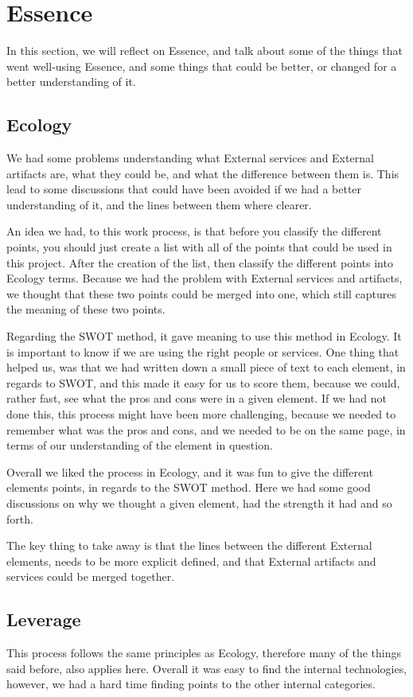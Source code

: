 \section{Essence}\label{sec:eval_essence}
In this section, we will reflect on Essence, and talk about some of the things that went well-using Essence, and some things that could be better, or changed for a better understanding of it.

\subsection{Ecology}
We had some problems understanding what External services and External artifacts are, what they could be, and what the difference between them is.
This lead to some discussions that could have been avoided if we had a better understanding of it, and the lines between them where clearer.

An idea we had, to this work process, is that before you classify the different points, you should just create a list with all of the points that could be used in this project.
After the creation of the list, then classify the different points into Ecology terms.
Because we had the problem with External services and artifacts, we thought that these two points could be merged into one, which still captures the meaning of these two points.

Regarding the SWOT method, it gave meaning to use this method in Ecology. 
It is important to know if we are using the right people or services.
One thing that helped us, was that we had written down a small piece of text to each element, in regards to SWOT, and this made it easy for us to score them, because we could, rather fast, see what the pros and cons were in a given element.
If we had not done this, this process might have been more challenging, because we needed to remember what was the pros and cons, and we needed to be on the same page, in terms of our understanding of the element in question.

Overall we liked the process in Ecology, and it was fun to give the different elements points, in regards to the SWOT method. 
Here we had some good discussions on why we thought a given element, had the strength it had and so forth.

The key thing to take away is that the lines between the different External elements, needs to be more explicit defined, and that External artifacts and services could be merged together.

\subsection{Leverage}
This process follows the same principles as Ecology, therefore many of the things said before, also applies here.
Overall it was easy to find the internal technologies, however, we had a hard time finding points to the other internal categories.


